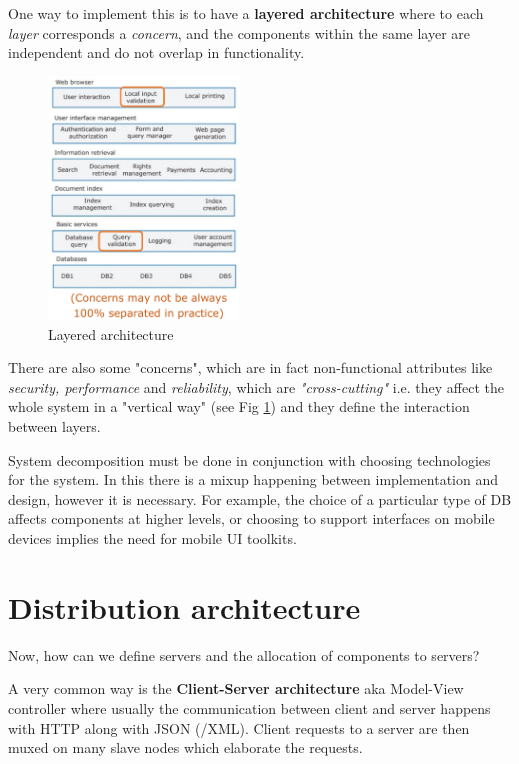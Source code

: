 One way to implement this is to have a \textbf{layered architecture} where to each \textit{layer} corresponds a \textit{concern}, and the components within the same layer are independent and do not overlap in functionality.
\begin{figure}[ht]
    \label{fig:layered_architecture}
    \centering
    \includegraphics[width=0.45\textwidth]{images/layered_architecture.png}
    \caption{Layered architecture}
\end{figure}
There are also some "concerns", which are in fact non-functional attributes like \textit{security, performance} and \textit{reliability}, which are \textit{"cross-cutting"} i.e. they affect the whole system in a "vertical way" (see Fig \ref{fig:layered_architecture}) and they define the interaction between layers.


System decomposition must be done in conjunction with choosing technologies for the system.
In this there is a mixup happening between implementation and design, however it is necessary.
For example, the choice of a particular type of DB affects components at higher levels, or choosing to support interfaces on mobile devices implies the need for mobile UI toolkits.

\section{Distribution architecture}
Now, how can we define servers and the allocation of components to servers?

A very common way is  the \textbf{Client-Server architecture}
aka Model-View controller where usually the communication between client and server happens with HTTP along with JSON (/XML).
Client requests to a server are then muxed on many slave nodes which elaborate the requests.

